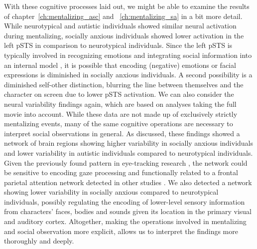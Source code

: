 With these cognitive processes laid out, we might be able to examine the results of chapter~\ref{ch:mentalizing_asc} and ~\ref{ch:mentalizing_sa} in a bit more detail. While neurotypical and autistic individuals showed similar neural activation during mentalizing, socially anxious individuals showed lower activation in the left pSTS in comparison to neurotypical individuals. Since the left pSTS is typically involved in recognizing emotions and integrating social information into an internal model \citep{peelen2010,samson2004}, it is possible that encoding (negative) emotions or facial expressions is diminished in socially anxious individuals. A second possibility is a diminished self-other distinction, blurring the line between themselves and the character on screen due to lower pSTS activation. We can also consider the neural variability findings again, which are based on analyses taking the full movie into account. While these data are not made up of exclusively strictly mentalizing events, many of the same cognitive operations are necessary to interpret social observations in general. As discussed, these findings showed a network of brain regions showing higher variability in socially anxious individuals and lower variability in autistic individuals compared to neurotypical individuals. Given the previously found pattern in eye-tracking research \citep{kleberg2017,ni2023}, the network could be sensitive to encoding gaze processing and functionally related to a frontal parietal attention network detected in other studies \citep{camacho2023,koban2023,tei2020}. We also detected a network showing lower variability in socially anxious compared to neurotypical individuals, possibly regulating the encoding of lower-level sensory information from characters' faces, bodies and sounds given its location in the primary visual and auditory cortex. Altogether, making the operations involved in mentalizing and social observation more explicit, allows us to interpret the findings more thoroughly and deeply. 

